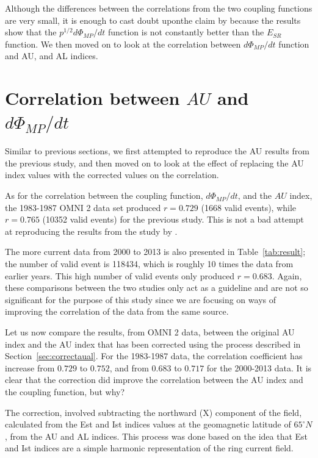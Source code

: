 \documentclass[12pt]{report} %
\begin{document}
Although the differences between the correlations from the two coupling functions are very small, it is enough to cast doubt uponthe claim by \cite{newell07} because the results show that the ${p^{1/2}d\Phi_{MP}/dt}$ function is not constantly better than the $E_{SR}$ function. We then moved on to look at the correlation between $d\Phi_{MP}/dt$ function and AU, and AL indices.



\vspace{0pt}
\section{Correlation between $AU$ and $d\Phi_{MP}/dt$}
\vspace{0pt}
Similar to previous sections, we first attempted to reproduce the AU results from the previous study, and then moved on to look at the effect of replacing the AU index values with the corrected values on the correlation.

  As for the correlation between the coupling function,  $d\Phi_{MP}/dt$, and the $AU$ index, the 1983-1987 OMNI 2 data set produced $r = 0.729$ (1668 valid events), while $r = 0.765$ (10352 valid events) for the previous study. This is not a bad attempt at reproducing the results from the study by \cite{newell07}.
  
The more current data from 2000 to 2013 is also presented in Table~\ref{tab:result}; the number of valid event is 118434, which is roughly 10 times the data from earlier years.  This high number of valid events only produced $r=0.683$. Again, these comparisons between the two studies only act as a guideline and are not so significant for the purpose of this study since we are focusing on ways of improving the correlation of the data from the same source. 

Let us now compare the results, from OMNI 2 data, between the original AU index and the AU index that has been corrected using the process described in Section~\ref{sec:correctaual}. For the 1983-1987 data, the correlation coefficient has increase from $0.729$ to $0.752$, and from $0.683$ to $0.717$ for the 2000-2013 data. It is clear that the correction did improve the correlation between the AU index and the coupling function, but why? 

The correction, involved subtracting the northward (X) component of the field, calculated from the Est and Ist indices values at the geomagnetic latitude of $65^{\circ}N$, from the AU and AL indices. This process was done based on the idea that Est and Ist indices are a simple harmonic representation of the ring current field.
\end{document}
